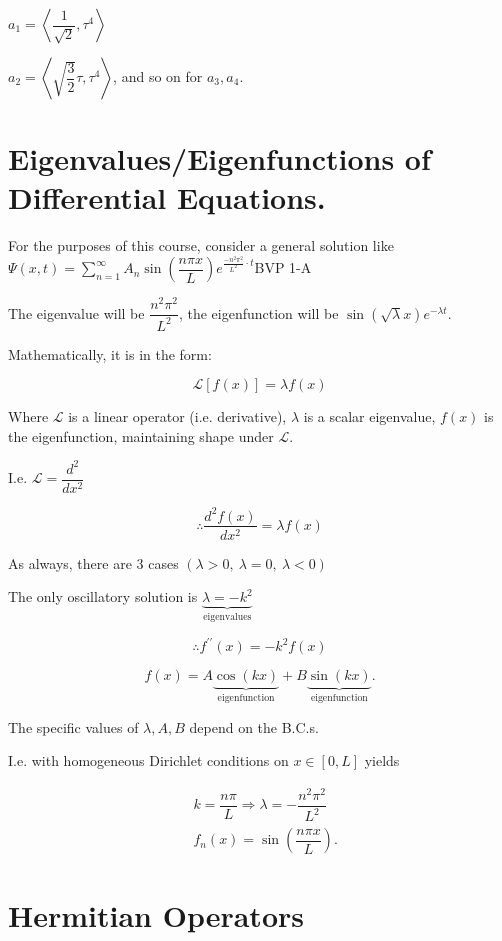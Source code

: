\documentclass{report}
\begin{document}
$a_{1}=\left\langle\dfrac{1}{\sqrt{2}}, \tau^{4}\right\rangle$

$a_{2}=\left\langle\sqrt{\dfrac{3}{2}} \tau, \tau^{4}\right\rangle$, and so on for $a_{3}, a_{4}$.

\section{Eigenvalues/Eigenfunctions of Differential Equations.}

For the purposes of this course, consider a general solution like $\Psi(x, t)=\sum\limits_{n=1}^{\infty} A_{n} \sin \left(\dfrac{n \pi x}{L}\right) e^{\frac{-n^{2} \pi^{2}}{L^{2}}\cdot t}$\qquad BVP 1-A

The eigenvalue will be $\dfrac{n^{2} \pi^{2}}{L^{2}}$, the eigenfunction will be $\sin (\sqrt{\lambda} x) e^{-\lambda t}$.

Mathematically, it is in the form:

$$
\mathcal{L}[f(x)]=\lambda f(x)
$$

Where $\mathcal{L}$ is a linear operator (i.e. derivative), $\lambda$ is a scalar eigenvalue, $f(x)$ is the eigenfunction, maintaining shape under $\mathcal{L}$.

I.e. $\mathcal{L}=\dfrac{d^{2}}{d x^{2}}$

$$
\therefore \dfrac{d^{2} f(x)}{d x^{2}}=\lambda f(x)
$$

As always, there are 3 cases $(\lambda>0,\ \lambda=0,\ \lambda<0)$

The only oscillatory solution is $\underbrace{\lambda=-k^{2}}_{\text{eigenvalues}}$

$$\therefore f^{\prime \prime}(x)=-k^{2} f(x)$$

$$
f(x)=A\!\underbrace{\cos(kx)}_{\text{eigenfunction}}+B\!\underbrace{\sin(kx)}_{\text{eigenfunction}}.
$$

The specific values of $\lambda, A, B$ depend on the B.C.s.

I.e. with homogeneous Dirichlet conditions on $x \in[0, L]$ yields

$$
\begin{aligned}
& k=\dfrac{n \pi}{L} \Rightarrow \lambda=-\dfrac{n^{2} \pi^{2}}{L^{2}} \\
& f_{n}(x)=\sin \left(\dfrac{n \pi x}{L}\right).
\end{aligned}
$$

\section{Hermitian Operators}
\end{document}

